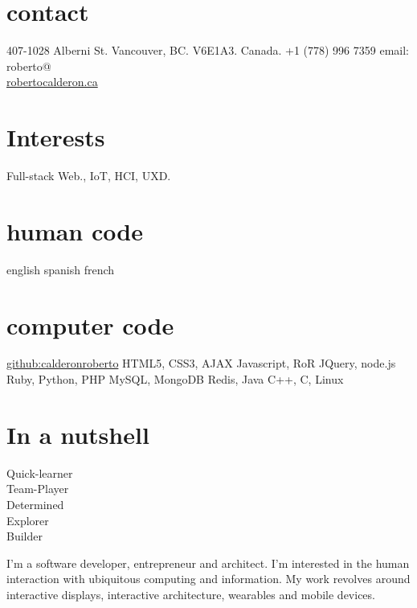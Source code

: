 \documentclass[full]{rvca}
\begin{document}
 
\begin{aside} %
\section{contact}
407-1028 Alberni St.
Vancouver, BC.
V6E1A3. Canada.
+1 (778) 996 7359
email: roberto@\\\href{http://robertocalderon.ca}{robertocalderon.ca}
\QrCode
\section{Interests}
Full-stack Web., IoT, HCI, UXD.
\section{human code}
english
spanish
french
\section{computer code}
\href{https://github.com/calderonroberto}{github:calderonroberto}
HTML5, CSS3, AJAX
Javascript, RoR \NinjaIcon
JQuery, node.js
Ruby, Python, PHP
MySQL, MongoDB
Redis, Java
C++, C, Linux
\section{In a nutshell}
Quick-learner\\Team-Player\\Determined\\Explorer\\Builder
\end{aside}
 
\begin{statement}
I'm a software developer, entrepreneur and architect. I'm interested in the human interaction with ubiquitous computing and information. My work revolves around interactive displays, interactive architecture, wearables and mobile devices.
\end{statement}
\end{document}
